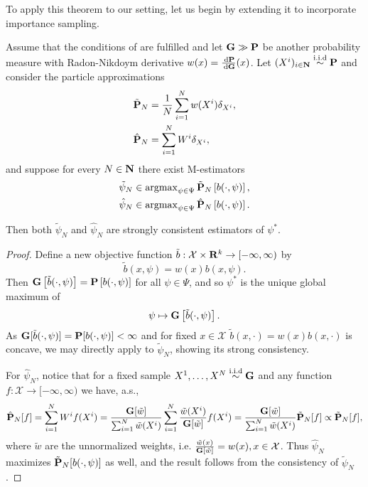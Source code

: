 To apply this theorem to our setting, let us begin by extending it to incorporate importance sampling. 

\begin{proposition}
    \label{prop:is-consistency}
    Assume that the conditions of  are fulfilled and let $\G \gg \P$ be another probability measure with Radon-Nikdoym derivative $w(x) = \rnd{\P}{\G}(x)$. 
    Let $(X^{i})_{i \in \N} \iid \P$ and consider the particle approximations 
    \begin{align*}
        \tilde \P_{N} &= \frac{1}{N}\sum_{i = 1}^N w(X^{i})\delta_{X^{i}},  \\ 
        \hat \P_{N} &= \sum_{i = 1}^{N} W^{i} \delta_{X^{i}},
    \end{align*}
    and suppose for every $N\in\N$ there exist M-estimators
    \begin{align*}
    \tilde \psi_{N} &\in \argmax_{\psi \in \Psi} \tilde \P _{N} \left[ b(\cdot, \psi) \right],\\
    \hat \psi_{N} &\in \argmax_{\psi \in \Psi} \hat \P _{N} \left[ b(\cdot, \psi) \right].
    \end{align*}

    Then both $\tilde\psi_{N}$ and $\hat\psi_{N}$ are strongly consistent estimators of $\psi^{\ast}$.
\end{proposition}
\begin{proof}
    Define a new objective function $\tilde b : \mathcal X \times \R^{k} \to [-\infty, \infty)$ by 
    $$
    \tilde b(x, \psi) = w(x) b(x, \psi).
    $$
    Then $\G \left[ \tilde b(\cdot, \psi) \right] = \P \left[ b(\cdot, \psi) \right]$ for all $\psi\in\Psi$, and so $\psi^{\ast}$ is the unique global maximum of $$\psi \mapsto \G \left[ \tilde b(\cdot, \psi) \right].$$ 
    As $\G [\tilde b(\cdot, \psi)] = \P [b(\cdot, \psi)] < \infty$ and for fixed $x\in\mathcal X$ $\tilde b(x, \cdot) = w(x)b(x,\cdot)$ is concave, we may directly apply  to $\tilde\psi_{N}$, showing its strong consistency.

    For $\hat\psi_{N}$, notice that for a fixed sample $X^{1}, \dots, X^{N} \iid \G$ and any function $f: \mathcal X \to [-\infty, \infty)$ we have, a.s., 
    $$
        \hat \P _{N} [f] = \sum_{i = 1}^{N} W^{i} f(X^{i}) = \frac{\G [\tilde w]}{\sum_{i = 1}^N \tilde w(X^{i})} \sum_{i = 1}^{N} \frac{\tilde w(X^{i})}{\G[\tilde w]} f(X^{i}) = \frac{\G [\tilde w]}{\sum_{i = 1}^{N} \tilde w(X^{i})} \tilde \P _{N} [f] \propto \tilde \P_{N} [f],
    $$
    where $\tilde w$ are the unnormalized weights, i.e. $ \frac{\tilde w(x)}{\G [\tilde w]} = w(x), x \in\mathcal X$.
    Thus $\hat \psi_{N}$ maximizes $\tilde \P_{N} [b(\cdot, \psi)]$ as well, and the result follows from the consistency of $\tilde \psi_{N}$.
\end{proof}

